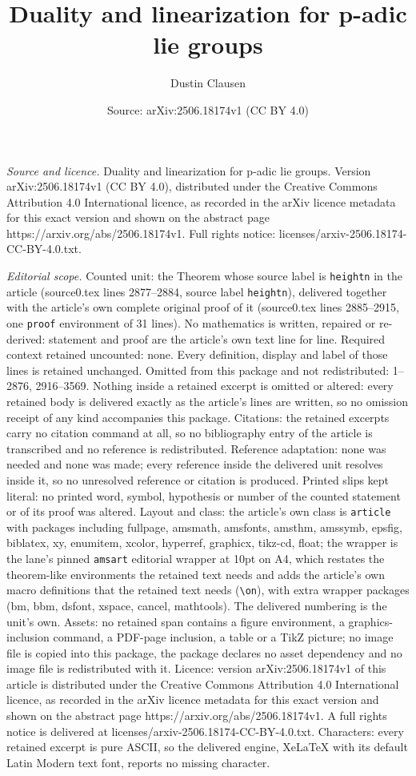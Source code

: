 \documentclass[10pt,a4paper]{amsart}
\title[Duality and linearization for p-adic lie groups]{Duality and linearization for p-adic lie groups}
\author{Dustin Clausen}
\date{Source: arXiv:2506.18174v1 (CC BY 4.0)}
\begin{document}
\maketitle

\noindent\emph{Source and licence.} Duality and linearization for p-adic lie groups. Version arXiv:2506.18174v1 (CC BY 4.0), distributed under the Creative Commons Attribution 4.0 International licence, as recorded in the arXiv licence metadata for this exact version and shown on the abstract page https://arxiv.org/abs/2506.18174v1. Full rights notice: licenses/arxiv-2506.18174-CC-BY-4.0.txt.\par\smallskip

\noindent\textit{Editorial scope.} Counted unit: the Theorem whose source label is \texttt{heightn} in the article (source0.tex lines 2877--2884, source label \texttt{heightn}), delivered together with the article's own complete original proof of it (source0.tex lines 2885--2915, one \texttt{proof} environment of 31 lines). No mathematics is written, repaired or re-derived: statement and proof are the article's own text line for line. Required context retained uncounted: none. Every definition, display and label of those lines is retained unchanged. Omitted from this package and not redistributed: 1--2876, 2916--3569. Nothing inside a retained excerpt is omitted or altered: every retained body is delivered exactly as the article's lines are written, so no omission receipt of any kind accompanies this package. Citations: the retained excerpts carry no citation command at all, so no bibliography entry of the article is transcribed and no reference is redistributed. Reference adaptation: none was needed and none was made; every reference inside the delivered unit resolves inside it, so no unresolved reference or citation is produced. Printed slips kept literal: no printed word, symbol, hypothesis or number of the counted statement or of its proof was altered. Layout and class: the article's own class is \texttt{article} with packages including fullpage, amsmath, amsfonts, amsthm, amssymb, epsfig, biblatex, xy, enumitem, xcolor, hyperref, graphicx, tikz-cd, float; the wrapper is the lane's pinned \texttt{amsart} editorial wrapper at 10pt on A4, which restates the theorem-like environments the retained text needs and adds the article's own macro definitions that the retained text needs (\texttt{\textbackslash on}), with extra wrapper packages (bm, bbm, dsfont, xspace, cancel, mathtools). The delivered numbering is the unit's own. Assets: no retained span contains a figure environment, a graphics-inclusion command, a PDF-page inclusion, a table or a TikZ picture; no image file is copied into this package, the package declares no asset dependency and no image file is redistributed with it. Licence: version arXiv:2506.18174v1 of this article is distributed under the Creative Commons Attribution 4.0 International licence, as recorded in the arXiv licence metadata for this exact version and shown on the abstract page https://arxiv.org/abs/2506.18174v1. A full rights notice is delivered at licenses/arxiv-2506.18174-CC-BY-4.0.txt. Characters: every retained excerpt is pure ASCII, so the delivered engine, XeLaTeX with its default Latin Modern text font, reports no missing character.
\end{document}

